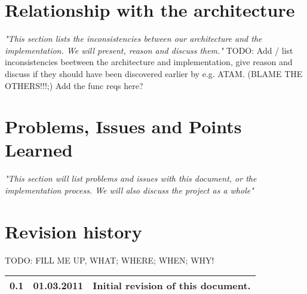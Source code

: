 \documentclass[titlepage,a4paper,11pt]{article}
\begin{document}
\section{Relationship with the architecture}
\emph{"This section lists the inconsistencies between our architecture and the implementation. We will present, reason and discuss them."}
\newpage	
TODO: Add / list inconsistencies beetween the architecture and implementation, give reason and discuss if they should
	have been discovered earlier by e.g. ATAM. (BLAME THE OTHERS!!!;)
	Add the func reqs here?
	

\section{Problems, Issues and Points Learned}
\emph{"This section will list problems and issues with this document, or the implementation process. We will also discuss the project as a whole"}
\newpage
	
	
\section{Revision history}

TODO: FILL ME UP, WHAT; WHERE; WHEN; WHY!

\begin{table}[H]
  \begin{tabular}{| c | c | c |}
    \hline
    0.1 & 01.03.2011 & Initial revision of this document. \\
    \hline
  \end{tabular}
\end{table}
\end{document}
